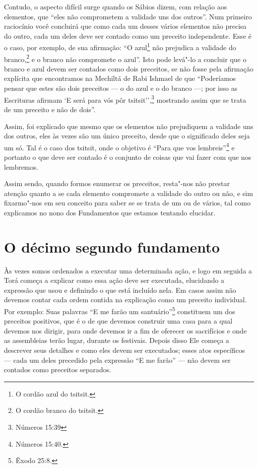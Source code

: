 Contudo, o aspecto difícil surge quando os Sábios dizem, com relação
aos elementos, que ``eles não comprometem a validade uns dos outros''.
Num primeiro raciocínio você concluirá que como cada um desses vários
elementos não precisa do outro, cada um deles deve ser contado como um
preceito independente. Esse é o caso, por exemplo, de sua afirmação:
``O azul\footnote{O cordão azul do tsitsit\starr.} não prejudica a validade do
branco,\footnote{O cordão branco do tsitsit\starr.} e o branco não compromete o azul''. Isto
pode levá"-lo a concluir que o branco e azul devem ser contados como dois
preceitos, se não fosse pela afirmação explícita que encontramos na
Mechiltá\starr{} de Rabi Ishmael\starr{} de que ``Poderíamos pensar que estes são dois
preceitos --- o do azul e o do branco ---; por isso as Escrituras
afirmam `E será para vós pôr tsitsit\starr'',\footnote{Números 15:39} mostrando
assim que se trata de um preceito e não de dois''.

Assim, foi explicado que mesmo que os elementos não prejudiquem a
validade uns dos outros, eles às vezes são um único preceito, desde que
o significado deles seja um só. Tal é o caso dos tsitsit\starr, onde o
objetivo é ``Para que vos lembreis''\footnote{Números 15:40.} e portanto o que
deve ser contado é o conjunto de coisas que vai fazer com que nos
lembremos.

Assim sendo, quando formos enumerar os preceitos, resta"-nos não prestar
atenção quanto a se cada elemento compromete a validade do outro ou não,
e sim fixarmo"-nos em seu conceito para saber se se trata de um ou de
vários, tal como explicamos no nono dos Fundamentos que estamos tentando
elucidar.



\chapter*{O décimo segundo fundamento}

Às vezes somos ordenados a executar uma determinada ação, e logo em
seguida a Torá\starr{} começa a explicar como essa ação deve ser executada,
elucidando a expressão que usou e definindo o que está incluído nela. Em
casos assim não devemos contar cada ordem contida na explicação como um
preceito individual. Por exemplo: Suas palavras ``E me farão um
santuário''\footnote{Êxodo 25:8.} constituem um dos preceitos positivos, que é o
de que devemos construir uma casa para a qual devemos nos dirigir, para
onde devemos ir a fim de oferecer os sacrifícios e onde as assembleias
terão lugar, durante os festivais. Depois disso Ele começa a descrever
seus detalhes e como eles devem ser executados; esses atos específicos
--- cada um deles precedido pela expressão ``E me farão'' --- não devem
ser contados como preceitos separados.

